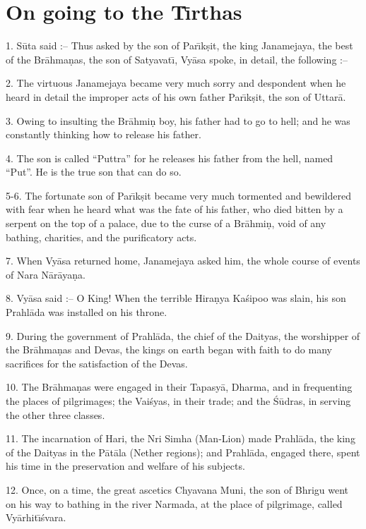 \chapter{On going to the T\={\i}rthas}

1. S\=uta said :-- Thus asked by the son of Par\={\i}k\d{s}it, the king Janamejaya, the best of the Br\=ahma\d{n}as, the son of Satyavat\={\i}, Vy\=asa spoke, in detail, the following :--

2. The virtuous Janamejaya became very much sorry and despondent when he heard in detail the improper acts of his own father Par\={\i}k\d{s}it, the son of Uttar\=a.

3. Owing to insulting the Br\=ahmi\d{n} boy, his father had to go to hell; and he was constantly thinking how to release his father.

4. The son is called ``Puttra'' for he releases his father from the hell, named ``Put''. He is the true son that can do so.

5-6. The fortunate son of Par\={\i}k\d{s}it became very much tormented and bewildered with fear when he heard what was the fate of his father, who died bitten by a serpent on the top of a palace, due to the curse of a Br\=ahmi\d{n}, void of any bathing, charities, and the purificatory acts.

7. When Vy\=asa returned home, Janamejaya asked him, the whole course of events of Nara N\=ar\=aya\d{n}a.

8. Vy\=asa said :-- O King! When the terrible Hira\d{n}ya Ka\'sipoo was slain, his son Prahl\=ada was installed on his throne.

9. During the government of Prahl\=ada, the chief of the Daityas, the worshipper of the Br\=ahma\d{n}as and Devas, the kings on earth began with faith to do many sacrifices for the satisfaction of the Devas.

10. The Br\=ahma\d{n}as were engaged in their Tapasy\=a, Dharma, and in frequenting the places of pilgrimages; the Vai\'syas, in their trade; and the \'S\=udras, in serving the other three classes.

11. The incarnation of Hari, the Nri Simha (Man-Lion) made Prahl\=ada, the king of the Daityas in the P\=at\=ala (Nether regions); and Prahl\=ada, engaged there, spent his time in the preservation and welfare of his subjects.

12. Once, on a time, the great ascetics Chyavana Muni, the son of Bhrigu went on his way to bathing in the river Narmada, at the place of pilgrimage, called Vy\=arhit\={\i}\'svara.

